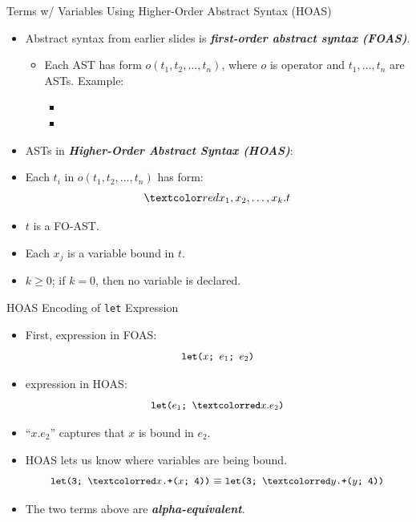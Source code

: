 \documentclass{beamer}
\renewcommand{\emph}[1]{\textbf{\textit{#1}}}
\begin{document}
\begin{frame}{Terms w/ Variables Using Higher-Order Abstract Syntax (HOAS)}
\begin{itemize}
\item Abstract syntax from earlier slides is
\emph{first-order abstract syntax (FOAS)}.
  \begin{itemize}
  \item Each AST has form $o(t_1, t_2, \ldots, t_n)$,
  where $o$ is operator and $t_1, \ldots, t_n$ are ASTs.
  Example:
\pause
    \begin{itemize}
    \item {}
    \item {}
    \end{itemize}
  \end{itemize}

\pause
\item ASTs in \emph{Higher-Order Abstract Syntax (HOAS)}:
\item Each $t_i$ in $o(t_1, t_2, \ldots, t_n)$ has form:
\[ \cemph{x_1, x_2, \ldots, x_k.t} \]
\item $t$ is a FO-AST.
\item Each $x_j$ is a variable bound in $t$.
\item $k \geq 0$; if $k = 0$, then no variable is declared.
\end{itemize}
\end{frame}


\begin{frame}{HOAS Encoding of \texttt{let} Expression}
\begin{itemize}
\item First,  expression in FOAS:
\[ \text{\small\texttt{let($x$; $e_1$; $e_2$)}} \]

\pause
\item {} expression in HOAS:
\[ \code{let($e_1$; \cemph{$x.e_2$})} \]
\item ``$x.e_2$'' captures that $x$ is bound in $e_2$.

\pause
\item HOAS lets us know where variables are being bound.
\[ \code{let(3; \cemph{$x$.+($x$; 4)})} \equiv \code{let(3; \cemph{$y$.+($y$; 4)})}\]
\item The two terms above are \emph{alpha-equivalent}.
\end{itemize}
\end{frame}
\end{document}
